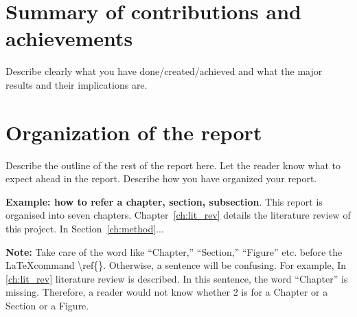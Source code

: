 \section{Summary of contributions and achievements} %
\label{sec:intro_sum_results} %
Describe clearly what you have done/created/achieved and what the major results and their implications are. 


\section{Organization of the report} %
\label{sec:intro_org} %
Describe the outline of the rest of the report here. Let the reader know what to expect ahead in the report. Describe how you have organized your report. 

\textbf{Example: how to refer a chapter, section, subsection}. This report is organised into seven chapters. Chapter~\ref{ch:lit_rev} details the literature review of this project. In Section~\ref{ch:method}...  %

\textbf{Note:}  Take care of the word like ``Chapter,'' ``Section,'' ``Figure'' etc. before the \LaTeX command \textbackslash ref\{\}. Otherwise, a  sentence will be confusing. For example, In \ref{ch:lit_rev} literature review is described. In this sentence, the word ``Chapter'' is missing. Therefore, a reader would not know whether 2 is for a Chapter or a Section or a Figure.

